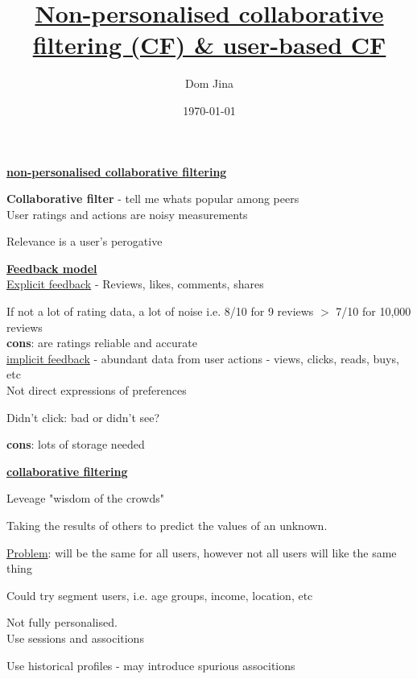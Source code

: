 \documentclass{article}
\title{\underline{Non-personalised collaborative filtering (CF) \& user-based CF}}
\author{Dom Jina}
\date{\today}
\begin{document}
\maketitle

\newpage

\underline{\textbf{non-personalised collaborative filtering}} \newline

\textbf{Collaborative filter} - tell me whats popular among peers \\

User ratings and actions are noisy measurements

Relevance is a user's perogative \newline

\underline{\textbf{Feedback model}} \\

\underline{Explicit feedback} - Reviews, likes, comments, shares

If not a lot of rating data, a lot of noise i.e. 8/10 for 9 reviews $>$ 7/10 for 10,000 reviews\\

\textbf{cons}: are ratings reliable and accurate \\

\underline{implicit feedback} - abundant data from user actions - views, clicks, reads, buys, etc \\

Not direct expressions of preferences

Didn't click: bad or didn't see?

\textbf{cons}: lots of storage needed

\newpage

\underline{\textbf{collaborative filtering}} \newline

Leveage "wisdom of the crowds"

Taking the results of others to predict the values of an unknown.

\underline{Problem}: will be the same for all users, however not all users will like the same thing

Could try segment users, i.e. age groups, income, location, etc

Not fully personalised. \\

Use sessions and associtions

Use historical profiles - may introduce spurious associtions
\end{document}

